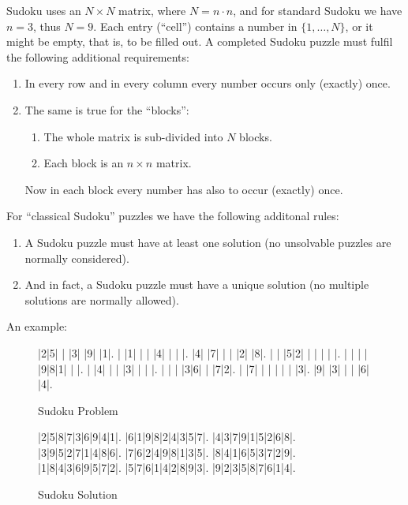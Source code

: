 \documentclass[11pt]{report}
\begin{document}
Sudoku uses an $N \times N$ matrix, where $N = n \cdot n$, and for standard Sudoku we have $n = 3$, thus $N = 9$. Each entry (``cell'') contains a number in $\{1, \dots, N\}$, or it might be empty, that is, to be filled out. A completed Sudoku puzzle must fulfil the following additional requirements:
\begin{enumerate}
\item In every row and in every column every number occurs only (exactly) once.
\item The same is true for the ``blocks'':
  \begin{enumerate}
  \item The whole matrix is sub-divided into $N$ blocks.
  \item Each block is an $n \times n$ matrix.
  \end{enumerate}
  Now in each block every number has also to occur (exactly) once.
\end{enumerate}
For ``classical Sudoku'' puzzles we have the following additonal rules:
\begin{enumerate}
\item A Sudoku puzzle must have at least one solution (no unsolvable puzzles are normally considered).
\item And in fact, a Sudoku puzzle must have a unique solution (no multiple solutions are normally allowed).
\end{enumerate}
An example:

\setlength\sudokusize{8cm}
\begin{figure}
\begin{sudoku}
 |2|5| | |3| |9| |1|.
 | |1| | | |4| | | |.
 |4| |7| | | |2| |8|.
 | | |5|2| | | | | |.
 | | | | |9|8|1| | |.
 | |4| | | |3| | | |.
 | | | |3|6| | |7|2|.
 | |7| | | | | | |3|.
 |9| |3| | | |6| |4|.
\end{sudoku}
\caption{Sudoku Problem}
\end{figure}

\begin{figure}
\begin{sudoku}
  |2|5|8|7|3|6|9|4|1|.
  |6|1|9|8|2|4|3|5|7|.
  |4|3|7|9|1|5|2|6|8|.
  |3|9|5|2|7|1|4|8|6|.
  |7|6|2|4|9|8|1|3|5|.
  |8|4|1|6|5|3|7|2|9|.
  |1|8|4|3|6|9|5|7|2|.
  |5|7|6|1|4|2|8|9|3|.
  |9|2|3|5|8|7|6|1|4|.
\end{sudoku}
\caption{Sudoku Solution}
\end{figure}
\end{document}
